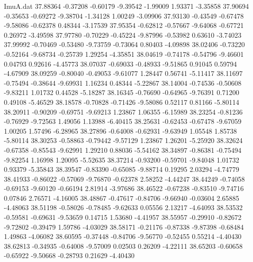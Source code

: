 \begin{filecontents}{ImuA.dat}
  37.88364   -0.37208   -0.60179   -9.39542   -1.99009    1.93371   -3.35858
  37.90694   -0.35653   -0.69272   -9.38704   -1.34128    1.00249   -3.09906
  37.93130   -0.43549   -0.67478   -9.58086   -0.62378    0.48344   -3.17539
  37.95354   -0.62812   -0.57667   -9.64068   -0.67721    0.26972   -3.49598
  37.97780   -0.70229   -0.45224   -9.87996   -0.53982    0.63610   -3.74023
  37.99992   -0.70469   -0.53480   -9.73759   -0.73064    0.80403   -4.09898
  38.02406   -0.73220   -0.52164   -9.68734   -0.25739    1.29254   -4.35851
  38.04619   -0.74178   -0.54796   -9.46601    0.04793    0.92616   -4.45773
  38.07037   -0.69033   -0.48933   -9.51865    0.91045    0.59794   -4.67909
  38.09259   -0.80040   -0.49053   -9.61077    1.28447    0.56741   -5.11417
  38.11697   -0.75494   -0.38644   -9.69931    1.16234    0.48344   -5.22867
  38.14004   -0.74536   -0.50608   -9.83211    1.01732    0.44528   -5.18287
  38.16345   -0.76690   -0.64965   -9.76391    0.71200    0.49108   -5.46529
  38.18578   -0.70828   -0.71426   -9.58086    0.52117    0.81166   -5.80114
  38.20911   -0.90209   -0.69751   -9.69213    1.23867    1.06355   -6.15989
  38.23254   -0.81236   -0.76929   -9.72563    1.49056    1.13988   -6.40415
  38.25631   -0.62453   -0.67478   -9.67059    1.00205    1.57496   -6.28965
  38.27896   -0.64008   -0.62931   -9.63949    1.05548    1.85738   -5.80114
  38.30253   -0.58863   -0.79442   -9.57129    1.23867    1.26201   -5.25920
  38.32624   -0.67358   -0.85543   -9.62991    1.29210    0.88036   -5.54162
  38.34897   -0.86381   -0.75494   -9.82254    1.16998    1.20095   -5.52635
  38.37214   -0.93200   -0.59701   -9.84048    1.01732    0.93379   -5.35843
  38.39547   -0.83390   -0.65085   -9.88714    0.19295    2.03294   -4.74779
  38.41933   -0.86022   -0.57069   -9.76870   -0.62378    2.58252   -4.44247
  38.44249   -0.74058   -0.69153   -9.60120   -0.66194    2.81914   -3.97686
  38.46522   -0.67238   -0.83510   -9.74716    0.07846    2.76571   -4.16005
  38.48867   -0.47617   -0.84706   -9.66940   -0.03604    2.65885   -4.48063
  38.51198   -0.58026   -0.78485   -9.62633    0.05556    2.13217   -4.64093
  38.53532   -0.59581   -0.69631   -9.53659    0.14715    1.53680   -4.41957
  38.55957   -0.29910   -0.82672   -9.72802   -0.39479    1.59786   -4.03029
  38.58171   -0.21176   -0.87338   -9.87398   -0.68484    1.49863   -4.06082
  38.60595   -0.37448   -0.84706   -9.56770   -0.52455    0.55214   -4.40430
  38.62813   -0.34935   -0.64008   -9.57009    0.02503    0.26209   -4.22111
  38.65203   -0.60658   -0.65922   -9.50668   -0.28793    0.21629   -4.40430

\end{filecontents}
